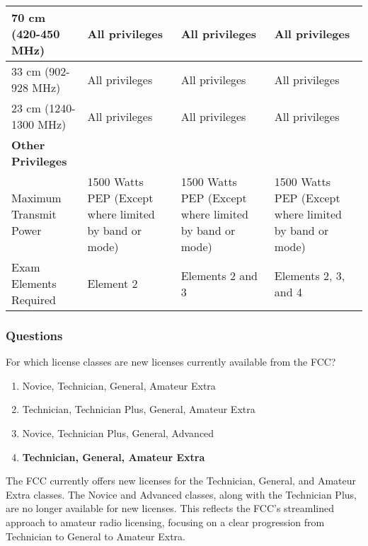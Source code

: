 \begin{table}[h!]
\begin{tabular}{|p{2.5cm}|p{3.5cm}|p{3.5cm}|p{3.5cm}|}
    \hline
    70 cm (420-450 MHz) & All privileges & All privileges & All privileges \\
    \hline
    33 cm (902-928 MHz) & All privileges & All privileges & All privileges \\
    \hline
    23 cm (1240-1300 MHz) & All privileges & All privileges & All privileges \\
    \hline
    \textbf{Other Privileges} &  &  &  \\
    \hline
    Maximum Transmit Power & 1500 Watts PEP (Except where limited by band or mode) & 1500 Watts PEP (Except where limited by band or mode) & 1500 Watts PEP (Except where limited by band or mode)\\
    \hline
    Exam Elements Required & Element 2 & Elements 2 and 3 & Elements 2, 3, and 4 \\
    \hline
    
    \end{tabular}
    \end{table}

\subsubsection*{Questions}
\begin{tcolorbox}[colback=gray!10!white,colframe=black!75!black,title={T1C01}]
For which license classes are new licenses currently available from the FCC?
\begin{enumerate}[label=\Alph*),noitemsep]
    \item Novice, Technician, General, Amateur Extra
    \item Technician, Technician Plus, General, Amateur Extra
    \item Novice, Technician Plus, General, Advanced
    \item \textbf{Technician, General, Amateur Extra}
\end{enumerate}
\end{tcolorbox}

 The FCC currently offers new licenses for the Technician, General, and Amateur Extra classes. The Novice and Advanced classes, along with the Technician Plus, are no longer available for new licenses. This reflects the FCC's streamlined approach to amateur radio licensing, focusing on a clear progression from Technician to General to Amateur Extra.

